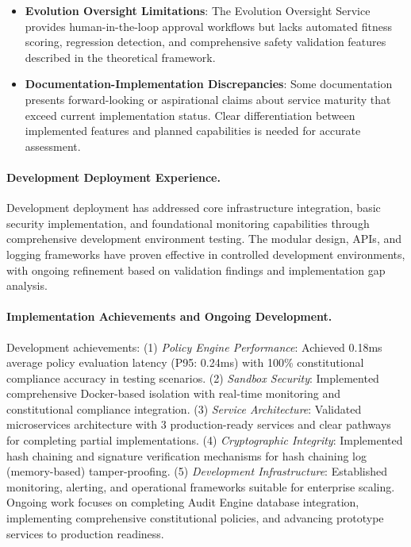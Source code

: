 \documentclass[manuscript,screen,9pt]{acmart}
\begin{document}
\begin{itemize}[leftmargin=*,itemsep=1pt,parsep=1pt]
	\item \textbf{Evolution Oversight Limitations}: The Evolution Oversight Service provides human-in-the-loop approval workflows but lacks automated fitness scoring, regression detection, and comprehensive safety validation features described in the theoretical framework.
	\item \textbf{Documentation-Implementation Discrepancies}: Some documentation presents forward-looking or aspirational claims about service maturity that exceed current implementation status. Clear differentiation between implemented features and planned capabilities is needed for accurate assessment.
\end{itemize}

\paragraph{Development Deployment Experience.} Development deployment has addressed core infrastructure integration, basic security implementation, and foundational monitoring capabilities through comprehensive development environment testing. The modular design, APIs, and logging frameworks have proven effective in controlled development environments, with ongoing refinement based on validation findings and implementation gap analysis.

\paragraph{Implementation Achievements and Ongoing Development.}
Development achievements: (1) \textit{Policy Engine Performance}: Achieved 0.18ms average policy evaluation latency (P95: 0.24ms) with 100\% constitutional compliance accuracy in testing scenarios. (2) \textit{Sandbox Security}: Implemented comprehensive Docker-based isolation with real-time monitoring and constitutional compliance integration. (3) \textit{Service Architecture}: Validated microservices architecture with 3 production-ready services and clear pathways for completing partial implementations. (4) \textit{Cryptographic Integrity}: Implemented hash chaining and signature verification mechanisms for hash chaining log (memory-based) tamper-proofing. (5) \textit{Development Infrastructure}: Established monitoring, alerting, and operational frameworks suitable for enterprise scaling. Ongoing work focuses on completing Audit Engine database integration, implementing comprehensive constitutional policies, and advancing prototype services to production readiness.
\end{document}
